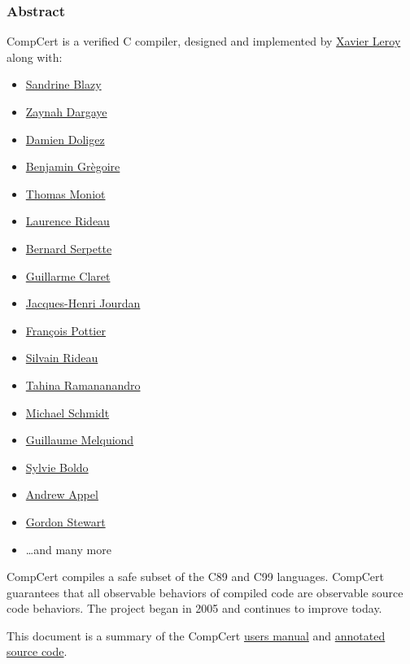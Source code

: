 \subsubsection*{Abstract}

CompCert is a verified C compiler, designed and implemented by \href{http://gallium.inria.fr/~xleroy/}{Xavier Leroy} along with:
\begin{multicols}{3}
\begin{itemize}
\item \href{http://www.irisa.fr/celtique/blazy/}{Sandrine Blazy}
\item \href{http://gallium.inria.fr/~dargaye/}{Zaynah Dargaye}
\item \href{http://cristal.inria.fr/~doligez/}{Damien Doligez}
\item \href{http://www-sop.inria.fr/members/Benjamin.Gregoire/}{Benjamin Gr\`egoire}
\item \href{https://www.linkedin.com/pub/thomas-moniot/22/217/b55?trk=pub-pbmap}{Thomas Moniot}
\item \href{http://www-sop.inria.fr/members/Laurence.Rideau/me.html}{Laurence Rideau}
\item \href{http://www-sop.inria.fr/members/Bernard.Serpette/}{Bernard Serpette}
\item \href{http://guillaume.claret.me/}{Guillarme Claret}
\item \href{https://jhjourdan.mketjh.fr/}{Jacques-Henri Jourdan}
\item \href{http://gallium.inria.fr/~fpottier/}{Fran\c{c}ois Pottier}
\item \href{http://www.normalesup.org/~srideau/eng/index.html}{Silvain Rideau}
\item \href{http://www.normalesup.org/~ramanana/}{Tahina Ramananandro}
\item \href{https://github.com/m-schmidt}{Michael Schmidt}
\item \href{https://github.com/silene}{Guillaume Melquiond}
\item \href{https://www.lri.fr/~sboldo/}{Sylvie Boldo}
\item \href{https://www.cs.princeton.edu/~appel/}{Andrew Appel}
\item \href{http://oucsace.cs.ohiou.edu/~gstewart/}{Gordon Stewart}
\item \ldots and many more
\end{itemize}
\end{multicols}

CompCert compiles a safe subset of the C89 and C99 languages.
CompCert guarantees that all observable behaviors of compiled code are observable source code behaviors.
The project began in 2005 and continues to improve today.

This document is a summary of the CompCert \href{http://compcert.inria.fr/man/}{users manual} and \href{http://compcert.inria.fr/doc/index.html}{annotated source code}.
